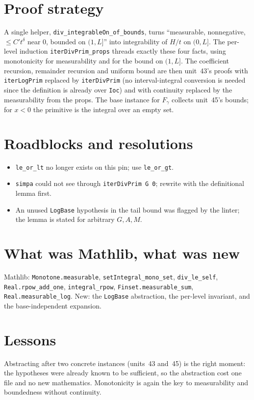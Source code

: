 \documentclass[11pt]{article}
\begin{document}
\section{Proof strategy}
A single helper, \texttt{div\_integrableOn\_of\_bounds}, turns ``measurable, nonnegative, $\le C't^\delta$
near $0$, bounded on $(1,L]$'' into integrability of $H/t$ on $(0,L]$. The per-level induction
\texttt{iterDivPrim\_props} threads exactly these four facts, using monotonicity for measurability and
for the bound on $(1,L]$. The coefficient recursion, remainder recursion and uniform bound are then
unit~43's proofs with \texttt{iterLogPrim} replaced by \texttt{iterDivPrim} (no interval-integral
conversion is needed since the definition is already over \texttt{Ioc}) and with continuity replaced by
the measurability from the props. The base instance for $F_\gamma$ collects unit~45's bounds; for
$x<0$ the primitive is the integral over an empty set.

\section{Roadblocks and resolutions}
\begin{itemize}
\item \texttt{le\_or\_lt} no longer exists on this pin; use \texttt{le\_or\_gt}.
\item \texttt{simpa} could not see through \texttt{iterDivPrim G 0}; rewrite with the definitional
lemma first.
\item An unused \texttt{LogBase} hypothesis in the tail bound was flagged by the linter; the lemma is
stated for arbitrary $G,A,M$.
\end{itemize}

\section{What was Mathlib, what was new}
Mathlib: \texttt{Monotone.measurable}, \texttt{setIntegral\_mono\_set}, \texttt{div\_le\_self},
\texttt{Real.rpow\_add\_one}, \texttt{integral\_rpow}, \texttt{Finset.measurable\_sum},
\texttt{Real.measurable\_log}. New: the \texttt{LogBase} abstraction, the per-level invariant, and the
base-independent expansion.

\section{Lessons}
Abstracting after two concrete instances (units~43 and~45) is the right moment: the hypotheses were
already known to be sufficient, so the abstraction cost one file and no new mathematics. Monotonicity is
again the key to measurability and boundedness without continuity.
\end{document}

